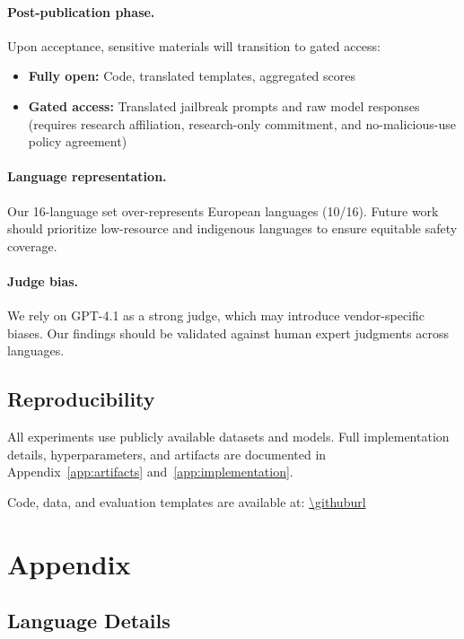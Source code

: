 \paragraph{Post-publication phase.} Upon acceptance, sensitive materials will transition to gated access:
\begin{itemize}[leftmargin=1.2em, itemsep=1pt]
  \item \textbf{Fully open:} Code, translated templates, aggregated scores
  \item \textbf{Gated access:} Translated jailbreak prompts and raw model responses (requires research affiliation, research-only commitment, and no-malicious-use policy agreement)
\end{itemize}

\paragraph{Language representation.} Our 16-language set over-represents European languages (10/16). Future work should prioritize low-resource and indigenous languages to ensure equitable safety coverage.

\paragraph{Judge bias.} We rely on GPT-4.1 as a strong judge, which may introduce vendor-specific biases. Our findings should be validated against human expert judgments across languages.


\subsection*{Reproducibility}

All experiments use publicly available datasets and models. Full implementation details, hyperparameters, and artifacts are documented in Appendix~\ref{app:artifacts} and~\ref{app:implementation}.

Code, data, and evaluation templates are available at: \url{\githuburl}

\clearpage


\clearpage
\appendix

\section{Appendix}

\subsection{Language Details}
\label{sec:languages}

